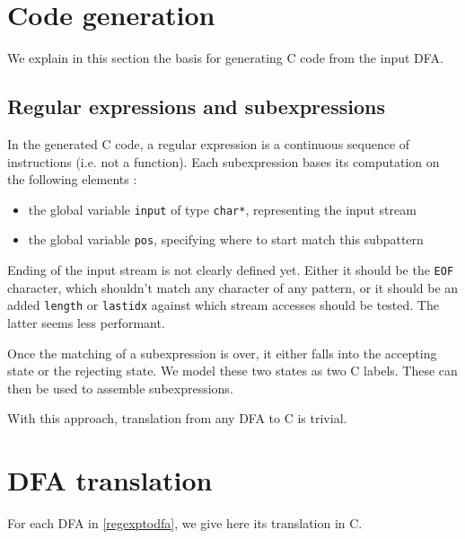 \documentclass[11pt,a4paper]{report}
\newcommand{\ccode}[1]{\texttt{#1}}
\begin{document}
\section{Code generation}

We explain in this section the basis for generating C code from the input DFA.

\subsection{Regular expressions and subexpressions}

In the generated C code, a regular expression is a continuous sequence of instructions (i.e. not a function). Each subexpression bases its computation on the following elements :
\begin{itemize}
\item the global variable \ccode{input} of type \ccode{char*}, representing the input stream
\item the global variable \ccode{pos}, specifying where to start match this subpattern
\end{itemize}

Ending of the input stream is not clearly defined yet. Either it should be the \texttt{EOF} character, which shouldn't match any character of any pattern, or it should be an added \ccode{length} or \ccode{lastidx} against which stream accesses should be tested. The latter seems less performant.

Once the matching of a subexpression is over, it either falls into the accepting state or the rejecting state. We model these two states as two C labels. These can then be used to assemble subexpressions.

With this approach, translation from any DFA to C is trivial.

\section{DFA translation}

For each DFA in \ref{regexptodfa}, we give here its translation in C.
\end{document}
